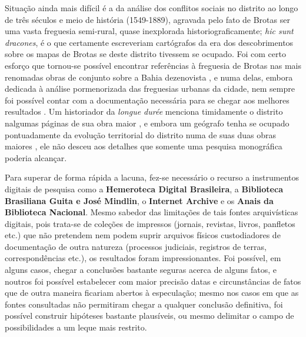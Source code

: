 Situação ainda mais difícil é a da análise dos conflitos sociais no distrito ao longo de três séculos e meio de história (1549-1889), agravada pelo fato de Brotas ser uma vasta freguesia semi-rural, quase inexplorada historiograficamente; \textit{hic sunt dracones}, é o que certamente escreveriam cartógrafos da era dos descobrimentos sobre os mapas de Brotas se deste distrito tivessem se ocupado. Foi com certo esforço que tornou-se possível encontrar referências à freguesia de Brotas nas mais renomadas obras de conjunto sobre a Bahia dezenovista \cite{MATTOSO1978, MATTOSO1992, NASCIMENTO2007}, e numa delas, embora dedicada à análise pormenorizada das freguesias urbanas da cidade, nem sempre foi possível contar com a documentação necessária para se chegar aos melhores resultados \cite{NASCIMENTO2007}. Um historiador da \textit{longue durée} menciona timidamente o distrito nalgumas páginas de sua obra maior \cite{TAVARES2008}, e embora um geógrafo tenha se ocupado pontuadamente da evolução territorial do distrito numa de suas duas obras maiores \cite{VASCONCELOS2002}, ele não desceu aos detalhes que somente uma pesquisa monográfica poderia alcançar. 

Para superar de forma rápida a lacuna, fez-se necessário o recurso a instrumentos digitais de pesquisa como a \textbf{Hemeroteca Digital Brasileira}, a \textbf{Biblioteca Brasiliana Guita e José Mindlin}, o \textbf{Internet Archive} e os \textbf{Anais da Biblioteca Nacional}. Mesmo sabedor das limitações de tais fontes arquivísticas digitais, pois trata-se de coleções de impressos (jornais, revistas, livros, panfletos etc.) que não pretendem nem podem suprir arquivos físicos custodiadores de documentação de outra natureza (processos judiciais, registros de terras, correspondências etc.), os resultados foram impressionantes. Foi possível, em alguns casos, chegar a conclusões bastante seguras acerca de alguns fatos, e noutros foi possível estabelecer com maior precisão datas e circunstâncias de fatos que de outra maneira ficariam abertos à especulação; mesmo nos casos em que as fontes consultadas não permitiram chegar a qualquer conclusão definitiva, foi possível construir hipóteses bastante plausíveis, ou mesmo delimitar o campo de possibilidades a um leque mais restrito.







%
